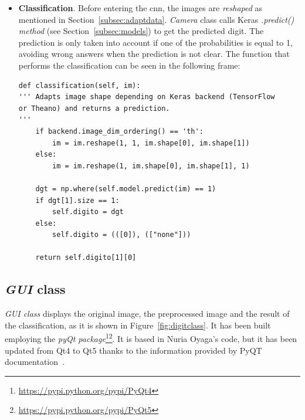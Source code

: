 \begin{itemize}
\begin{lstlisting}[frame=single]
	im_res = cv2.resize(im_blur, (28, 28))
	
	# Edge extraction.
	im_sobel_x = cv2.Sobel(im_res, cv2.CV_32F, 1, 0, ksize=5)
	im_sobel_y = cv2.Sobel(im_res, cv2.CV_32F, 0, 1, ksize=5)
	im_edges = cv2.add(abs(im_sobel_x), abs(im_sobel_y))
	im_edges = cv2.normalize(im_edges, None, 0, 255, cv2.NORM_MINMAX)
	im_edges = np.uint8(im_edges)
	
	return im_edges
\end{lstlisting}
	
	\item \textbf{Classification}. Before entering the \gls{cnn}, the images are \emph{reshaped} as mentioned in Section~\ref{subsec:adaptdata}. \textit{Camera} class calls Keras \emph{\textit{.predict()} method} (see Section~\ref{subsec:models}) to get the predicted digit. The prediction is only taken into account if one of the probabilities is equal to 1, avoiding wrong answers when the prediction is not clear. The function that performs the classification can be seen in the following frame:
\begin{lstlisting}
def classification(self, im):
''' Adapts image shape depending on Keras backend (TensorFlow
or Theano) and returns a prediction.
'''
	if backend.image_dim_ordering() == 'th':
		im = im.reshape(1, 1, im.shape[0], im.shape[1])            
	else:      
		im = im.reshape(1, im.shape[0], im.shape[1], 1)            
	
	dgt = np.where(self.model.predict(im) == 1)
	if dgt[1].size == 1:
		self.digito = dgt
	else:
		self.digito = (([0]), (["none"]))
	
	return self.digito[1][0]
\end{lstlisting}
\end{itemize}

\subsection{\textit{GUI} class}
\emph{\textit{GUI} class} displays the original image, the preprocessed image and the result of the classification, as it is shown in Figure~\ref{fig:digitclass}. It has been built employing the \emph{pyQt package}\footnote{\url{https://pypi.python.org/pypi/PyQt4}}\footnote{\url{https://pypi.python.org/pypi/PyQt5}}. It is based in Nuria Oyaga's code, but it has been updated from Qt4 to Qt5 thanks to the information provided by PyQT documentation~\cite{pyqt5}.

